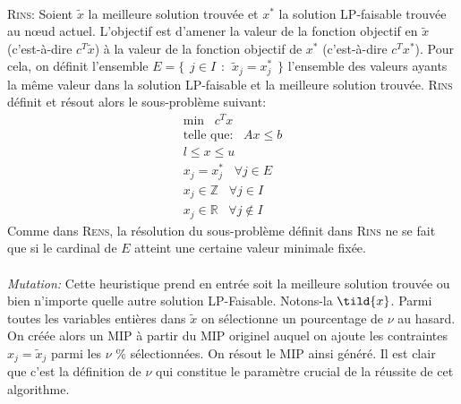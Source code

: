 \documentclass[12pt,a4paper,oneside]{book}
\theoremstyle{definition}
\newcommand{\R}{\mathbb{R}}
\begin{document}
	\paragraph{}
	\textsc{Rins:} Soient $\tilde{x}$ la meilleure solution trouvée et $x^*$ la solution LP-faisable trouvée au nœud actuel. L'objectif est d'amener la valeur de la fonction objectif en $\tilde{x}$ (c'est-à-dire $c^T \tilde{x}$) à la valeur de la fonction objectif de $x^*$ (c'est-à-dire $c^T x^*$). Pour cela, on définit l'ensemble $ E = \{\hspace{5pt} j \in I \hspace{5pt} : \hspace{5pt} \tilde{x}_j = x^*_j \hspace{5pt}\}$ l'ensemble des valeurs ayants la même valeur dans la solution LP-faisable et la meilleure solution trouvée. \textsc{Rins} définit et résout alors le sous-problème suivant:
	\begin{equation}
		\begin{aligned}
			\text{min} \hspace{10pt}  c^T x \\
			\text{telle que:} \hspace{10pt} Ax \leq b \\ 
			l \leq x \leq u \\
			x_j = x^*_j \hspace{10pt} \forall j \in E \\
			x_j \in \mathbb{Z} \hspace{10pt} \forall j \in I \\
			x_j \in \R \hspace{10pt} \forall j \notin I
		\end{aligned}
	\end{equation}
	Comme dans \textsc{Rens}, la résolution du sous-problème définit dans \textsc{Rins} ne se fait que si le cardinal de $E$ atteint une certaine valeur minimale fixée.
	
	\paragraph{}
	\textit{Mutation:} Cette heuristique prend en entrée soit la meilleure solution trouvée ou bien n'importe quelle autre solution LP-Faisable. Notons-la $\tild{x}$.
	Parmi toutes les variables entières dans $\tilde{x}$ on sélectionne un pourcentage de $\nu $ au hasard. On créée alors un MIP à partir du MIP originel auquel on ajoute les contraintes $ x_j  = \tilde{x}_j$ parmi les $\nu$ \% sélectionnées. On résout le MIP ainsi généré. Il est clair que c'est la définition de $\nu$ qui constitue le paramètre crucial de la réussite de cet algorithme. 
		
\end{document}
